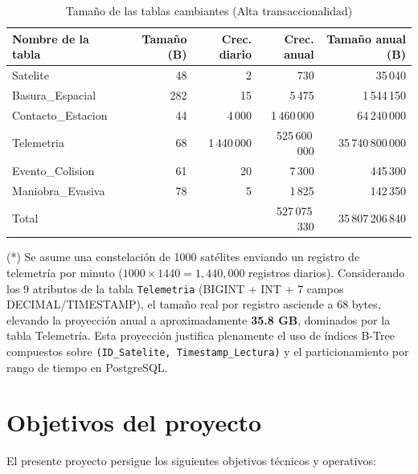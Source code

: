 \begin{table}[H]
\centering
\footnotesize
\begin{tabular}{lrrrr}
\toprule
\textbf{Nombre de la tabla} & \textbf{Tamaño (B)} & \textbf{Crec. diario} & \textbf{Crec. anual} & \textbf{Tamaño anual (B)} \\
\midrule
Satelite & 48 & 2 & 730 & 35\,040 \\
Basura\_Espacial & 282 & 15 & 5\,475 & 1\,544\,150 \\
Contacto\_Estacion & 44 & 4\,000 & 1\,460\,000 & 64\,240\,000 \\
Telemetria & 68 & 1\,440\,000 & 525\,600\,000 & 35\,740\,800\,000 \\
Evento\_Colision & 61 & 20 & 7\,300 & 445\,300 \\
Maniobra\_Evasiva & 78 & 5 & 1\,825 & 142\,350 \\
\midrule
Total & & & 527\,075\,330 & 35\,807\,206\,840 \\
\bottomrule
\end{tabular}
\caption{Tamaño de las tablas cambiantes (Alta transaccionalidad)}
\end{table}

(*) Se asume una constelación de 1000 satélites enviando un registro de telemetría por minuto ($1000 \times 1440 = 1{,}440{,}000$ registros diarios). Considerando los 9 atributos de la tabla \texttt{Telemetria} (BIGINT + INT + 7 campos DECIMAL/TIMESTAMP), el tamaño real por registro asciende a 68 bytes, elevando la proyección anual a aproximadamente \textbf{35.8 GB}, dominados por la tabla Telemetría. Esta proyección justifica plenamente el uso de índices B-Tree compuestos sobre \texttt{(ID\_Satelite, Timestamp\_Lectura)} y el particionamiento por rango de tiempo en PostgreSQL.

\section{Objetivos del proyecto}

El presente proyecto persigue los siguientes objetivos técnicos y operativos:

